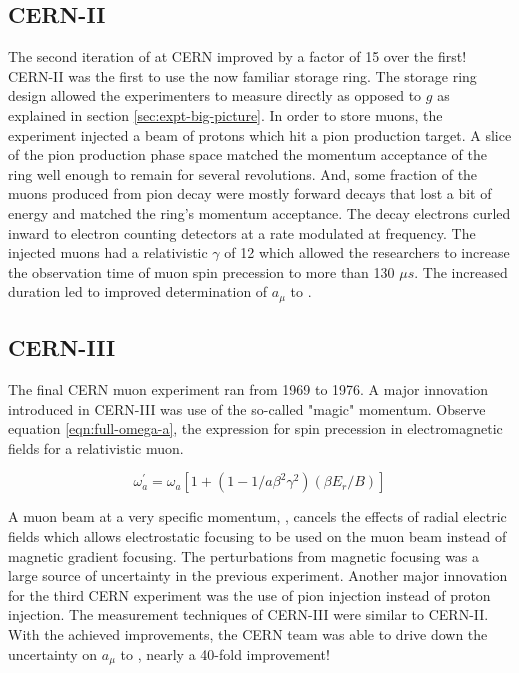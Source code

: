 \subsection{CERN-II}
The second iteration of \mugmtwo at CERN improved by a factor of 15 over the first!  CERN-II was the first \mugmtwo to use the now familiar storage ring.  The storage ring design allowed the experimenters to measure \gmtwo directly as opposed to $g$ as explained in section \ref{sec:expt-big-picture}. In order to store muons, the experiment injected a beam of protons which hit a pion production target.  A slice of the pion production phase space matched the momentum acceptance of the ring well enough to remain for several revolutions. And, some fraction of the muons produced from pion decay were mostly forward decays that lost a bit of energy and matched the ring's momentum acceptance.  The decay electrons curled inward to electron counting detectors at a rate modulated at \gmtwo frequency.  The injected muons had a relativistic $\gamma$ of 12 which allowed the researchers to increase the observation time of muon spin precession to more than 130 $\mu s$.  The increased duration led to improved determination of $a_\mu$ to \cite{47y-muon-g-2}.

\subsection{CERN-III}
The final CERN muon \gmtwo experiment ran from 1969 to 1976.  A major innovation introduced in CERN-III was use of the so-called "magic" momentum. Observe equation \ref{eqn:full-omega-a}, the expression for spin precession in electromagnetic fields for a relativistic muon.

\begin{equation}
\label{eqn:full-omega-a}
\omega^\prime_a = \omega_a[1 + (1 - 1 / a \beta^2 \gamma^2)(\beta E_r / B)]
\end{equation}

\noindent A muon beam at a very specific momentum, \pmagic, cancels the effects of radial electric fields which allows electrostatic focusing to be used on the muon beam instead of magnetic gradient focusing.  The perturbations from magnetic focusing was a large source of uncertainty in the previous experiment.  Another major innovation for the third CERN experiment was the use of pion injection instead of proton injection.  The measurement techniques of CERN-III were similar to CERN-II.  With the achieved improvements, the CERN team was able to drive down the uncertainty on $a_\mu$ to \cite{47y-muon-g-2}, nearly a 40-fold improvement!

